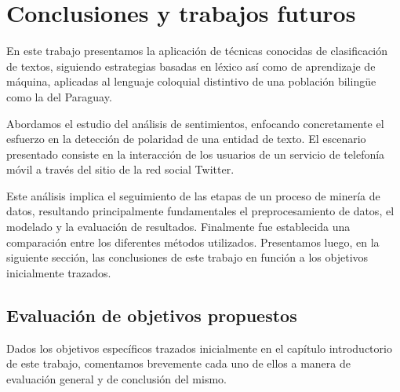 \chapter{Conclusiones y trabajos futuros}\label{conclusiones}

En este trabajo presentamos la aplicaci\'on de t\'ecnicas conocidas de clasificaci\'on de textos, siguiendo estrategias basadas en l\'exico as\'i como de aprendizaje de m\'aquina, aplicadas al lenguaje coloquial distintivo de una poblaci\'on biling\"ue como la del Paraguay.
\newline

Abordamos el estudio del an\'alisis de sentimientos, enfocando concretamente el esfuerzo en la detecci\'on de polaridad de una entidad de texto. El escenario presentado consiste en la interacci\'on de los usuarios de un servicio de telefon\'ia m\'ovil a trav\'es del sitio de la red social Twitter.
\newline

Este an\'alisis implica el seguimiento de las etapas de un proceso de miner\'ia de datos, resultando principalmente fundamentales el preprocesamiento de datos, el modelado y la evaluaci\'on de resultados. Finalmente fue establecida una comparaci\'on entre los diferentes m\'etodos utilizados. Presentamos luego, en la siguiente secci\'on, las conclusiones de este trabajo en funci\'on a los objetivos inicialmente trazados.

\section{Evaluaci\'on de objetivos propuestos}

Dados los objetivos espec\'ificos trazados inicialmente en el cap\'itulo introductorio de este trabajo, comentamos brevemente cada uno de ellos a manera de evaluaci\'on general y de conclusi\'on del mismo.

